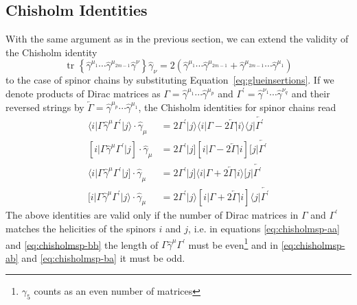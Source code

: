 \documentclass[preprint,number,12pt,sort&compress]{elsarticle}
\DeclareMathOperator{\Trace}{tr}
\newcommand{\tr}[2][{}]{\Trace^{#1}\!\left\{{#2}\right\}}
\newcommand{\bra}[1]{\langle #1 \vert}
\newcommand{\brb}[1]{[ #1 \vert}
\newcommand{\kea}[1]{\vert #1 \rangle}
\newcommand{\keb}[1]{\vert #1 ]}
\newcommand{\Spaa}[1]{\langle #1 \rangle}
\newcommand{\Spab}[1]{\langle #1]}
\newcommand{\Spba}[1]{[ #1 \rangle}
\newcommand{\Spbb}[1]{[ #1 ]}
\begin{document}
\subsection{Chisholm Identities}\label{ssec:chisholm}
With the same argument as in the previous section, we can extend the
validity of the Chisholm identity
\begin{equation}
\tr{\hat{\gamma}^{\mu_1}\cdots\hat{\gamma}^{\mu_{2m-1}}\hat{\gamma}^\nu}%
\hat{\gamma}_\nu=2\left(
\hat{\gamma}^{\mu_1}\cdots\hat{\gamma}^{\mu_{2m-1}}+
\hat{\gamma}^{\mu_{2m-1}}\cdots\hat{\gamma}^{\mu_1}
\right)
\end{equation}
to the case of spinor chains by substituting
Equation~\eqref{eq:glueinsertions}. If we denote products of
Dirac matrices as $\Gamma=\hat{\gamma}^{\mu_1}\cdots\hat{\gamma}^{\mu_p}$
and $\Gamma^\prime=\hat{\gamma}^{\nu_1}\cdots\hat{\gamma}^{\nu_q}$ and
their reversed strings by
$\overleftarrow{\Gamma}=\hat{\gamma}^{\mu_p}\cdots\hat{\gamma}^{\mu_1}$,
the Chisholm identities for spinor chains read
\begin{subequations}\label{eq:chisholmsp}
\begin{align}
\label{eq:chisholmsp-aa}
\Spaa{i\vert\Gamma\hat{\gamma}^\mu\Gamma^\prime\vert j}\cdot\hat{\gamma}_\mu
&=2\Gamma^\prime\kea{j}\bra{i}\Gamma
 -2\overleftarrow{\Gamma}\kea{i}\bra{j}\overleftarrow{\Gamma^\prime}\\
\label{eq:chisholmsp-bb}
\Spbb{i\vert\Gamma\hat{\gamma}^\mu\Gamma^\prime\vert j}\cdot\hat{\gamma}_\mu
&=2\Gamma^\prime\keb{j}\brb{i}\Gamma
 -2\overleftarrow{\Gamma}\keb{i}\brb{j}\overleftarrow{\Gamma^\prime}\\
\label{eq:chisholmsp-ab}
\Spab{i\vert\Gamma\hat{\gamma}^\mu\Gamma^\prime\vert j}\cdot\hat{\gamma}_\mu
&=2\Gamma^\prime\keb{j}\bra{i}\Gamma
 +2\overleftarrow{\Gamma}\kea{i}\brb{j}\overleftarrow{\Gamma^\prime}\\
\label{eq:chisholmsp-ba}
\Spba{i\vert\Gamma\hat{\gamma}^\mu\Gamma^\prime\vert j}\cdot\hat{\gamma}_\mu
&=2\Gamma^\prime\kea{j}\brb{i}\Gamma
 +2\overleftarrow{\Gamma}\keb{i}\bra{j}\overleftarrow{\Gamma^\prime}
\end{align}
\end{subequations}
The above identities are valid only if the number of Dirac matrices
in $\Gamma$ and $\Gamma^\prime$ matches the helicities of the spinors
$i$ and $j$, i.e. in equations \eqref{eq:chisholmsp-aa} and \eqref{eq:chisholmsp-bb}
the length of $\Gamma\hat\gamma^\mu\Gamma^\prime$ must be even\footnote{
$\gamma_5$ counts as an even number of matrices} and in
\eqref{eq:chisholmsp-ab} and \eqref{eq:chisholmsp-ba} it must be odd.
\end{document}
